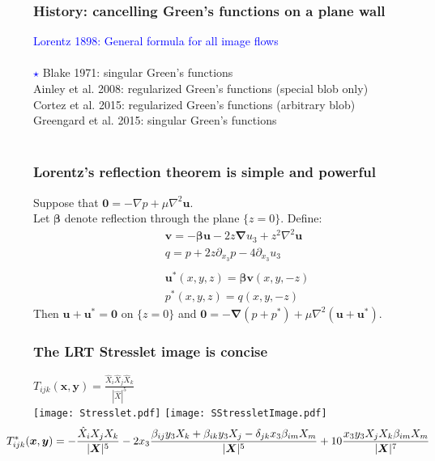 \documentclass{beamer}
\newcommand{\bm}{\boldsymbol}
\begin{document}
% 
% 

\begin{frame}
\frametitle{History: cancelling Green's functions on a plane wall} 
\textcolor{blue}{Lorentz 1898: General formula for all image flows}\\
\ \\
\textcolor{blue}{$\star$} Blake 1971: singular Green's functions \\
Ainley et al. 2008: regularized Green's functions (special blob only)\\
Cortez et al. 2015: regularized Green's functions (arbitrary blob)\\
Greengard et al. 2015: singular Green's functions
\\\ \\

\end{frame}

\begin{frame}
\frametitle{Lorentz's reflection theorem is simple and powerful}
Suppose that $\bm 0 = -\nabla p + \mu \nabla^2 \bm u$.  \\
Let $\bm \beta$ denote reflection through the plane $\{z = 0\}$.  Define:
\begin{gather}
\label{eq:uhatdef} \bm v = -\bm\beta \bm u - 2z\bm \nabla u_3+z^2 \nabla^2 \bm u\\
\label{eq:phatdef} q = p + 2z\partial_{x_3} p - 4\partial_{x_3} u_3\\
\nonumber \ \\
\label{eq:ustardef} \bm u^*(x,y,z) = \bm \beta \bm v(x,y,-z)\\
\label{eq:pstardef} p^*(x,y,z) = q(x,y,-z)
\end{gather}
Then $\bm u + \bm u^* = \bm 0$ on $\{z = 0\}$ and $\bm 0 = -\bm\nabla(p+p^*) + \mu\nabla^2(\bm u+\bm u^*)$.  
\end{frame}


\begin{frame}
\frametitle{The LRT Stresslet image is concise}
\begin{center}
\(\displaystyle T_{ijk}(\bm x,\bm y) = \frac{\hat X_i \hat X_j\hat X_k}{|\hat X|^5}\)\\
\texttt{[image: Stresslet.pdf]} 
\pause
{\texttt{[image: SStressletImage.pdf]} 
\vspace{-0.2in}
{\small
\begin{align*}
&\hspace{-0.35in} T^*_{ijk}(\bm x,\bm y) = -\frac{\hat X_iX_jX_k}{|\bm X|^5} - 2x_3\frac{\beta_{ij}y_3X_k+\beta_{ik}y_3X_j-\delta_{jk}x_3\beta_{im}X_m}{|\bm  X|^5} + 10\frac{x_3y_3X_jX_k\beta_{im}X_m}{|\bm  X|^7}
\end{align*}
}
}
\end{center}
\end{frame}
\end{document}
